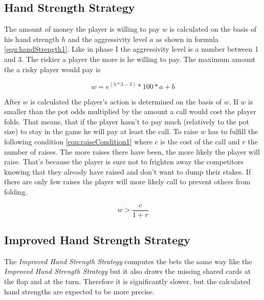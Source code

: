\subsection{Hand Strength Strategy}
The amount of money the player is willing to pay $w$ is calculated on the basis of his hand strength $h$ and the aggressivity level $a$ as shown in formula \ref{equ:handStrength1}. Like in phase I the aggressivity level is a number between 1 and 3. The riskier a player the more is he willing to pay. The maximum amount the a risky player would pay is 

\begin{equation}
	\label{equ:handStrength1}
	w = e^{(h * 3 - 3)} * 100 * a + b
\end{equation}

After $w$ is calculated the player's action is determined on the basis of $w$. If $w$ is smaller than the pot odds multiplied by the amount a call would cost the player folds. That means, that if the player hasn't to pay much (relatively to the pot size) to stay in the game he will pay at least the call. To raise $w$ has to fulfill the following condition \ref{equ:raiseCondition1} where $c$ is the cost of the call and $r$ the number of raises. The more raises there have been, the more likely the player will raise. That's because the player is sure not to frighten away the competitors knowing that they already have raised and don't want to dump their stakes. If there are only few raises the player will more likely call to prevent others from folding.

\begin{equation}
	\label{equ:raiseCondition}
	w > \frac{c}{1 + r}
\end{equation}


\subsection{Improved Hand Strength Strategy}
The \emph{Improved Hand Strength Strategy} computes the bets the same way like the \emph{Improved Hand Strength Strategy} but it also draws the missing shared cards at the flop and at the turn. Therefore it is significantly slower, but the calculated hand strengths are expected to be more precise.

